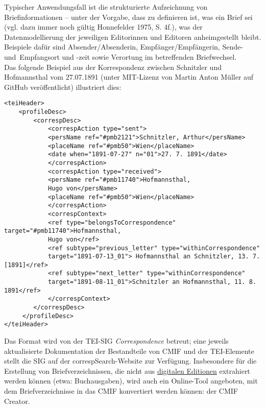 \documentclass{article}
\begin{document}
        Typischer Anwendungsfall ist die strukturierte Aufzeichnung von Briefinformationen
                  – unter der Vorgabe, dass zu definieren ist, was ein Brief sei (vgl. dazu
                     immer noch gültig Honnefelder 1975, S. 4f.), was der Datenmodellierung
                  der jeweiligen Editorinnen und Editoren anheimgestellt bleibt. Beispiele dafür
                  sind Absender/Absenderin, Empfänger/Empfängerin, Sende- und Empfangsort und -zeit
                  sowie Verortung im betreffenden Briefwechsel. \\
            
        Das folgende Beispiel aus der Korrespondenz zwischen Schnitzler und Hofmannsthal
            vom 27.07.1891 (unter MIT-Lizenz von Martin Anton Müller auf GitHub veröffentlicht) illustriert dies: \\
            
        \begin{verbatim}
<teiHeader>
    <profileDesc>
        <correspDesc>
            <correspAction type="sent">
            <persName ref="#pmb2121">Schnitzler, Arthur</persName>
            <placeName ref="#pmb50">Wien</placeName>
            <date when="1891-07-27" n="01">27. 7. 1891</date>
            </correspAction>
            <correspAction type="received">
            <persName ref="#pmb11740">Hofmannsthal, 
            Hugo von</persName>
            <placeName ref="#pmb50">Wien</placeName>
            </correspAction>
            <correspContext>
            <ref type="belongsToCorrespondence" target="#pmb11740">Hofmannsthal,
            Hugo von</ref>
            <ref subtype="previous_letter" type="withinCorrespondence" 
            target="1891-07-13_01"> Hofmannsthal an Schnitzler, 13. 7. [1891]</ref>
            <ref subtype="next_letter" type="withinCorrespondence" 
            target="1891-08-11_01">Schnitzler an Hofmannsthal, 11. 8. 1891</ref>
            </correspContext>
        </correspDesc>
     </profileDesc>
</teiHeader>\end{verbatim}Das Format wird von der TEI-SIG \emph{Correspondence} betreut;
                  eine jeweils aktualisierte Dokumentation der Bestandteile von CMIF und der
                  TEI-Elemente stellt die SIG auf der correspSearch-Website
                  zur Verfügung. Insbesondere für die Erstellung von Briefverzeichnissen, die nicht
                  aus \href{http://gams.uni-graz.at/o:konde.59}{digitalen Editionen} extrahiert
                  werden können (etwa: Buchausgaben), wird auch ein Online-Tool angeboten, mit dem
                  Briefverzeichnisse in das CMIF konvertiert werden können: der CMIF Creator. \\
            
\end{document}
